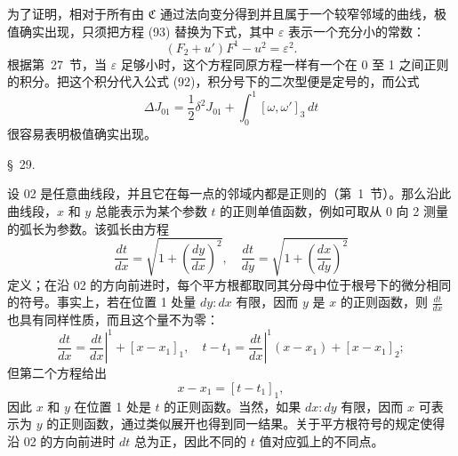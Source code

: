 \documentclass[11pt,a4paper,leqno]{article}
\begin{document}
为了证明，相对于所有由 $\mathfrak C$ 通过法向变分得到并且属于一个较窄邻域的曲线，极值确实出现，只须把方程 (93) 替换为下式，其中 $\varepsilon$ 表示一个充分小的常数：
\[
(F_2+u')F^1-u^2=\varepsilon^2.
\]
根据第~27~节，当 $\varepsilon$ 足够小时，这个方程同原方程一样有一个在 0 至 1 之间正则的积分。把这个积分代入公式 (92)，积分号下的二次型便是定号的，而公式
\[
\Delta J_{01}=\frac12\delta^2J_{01}+\int_0^1[\omega,\omega']_3\,dt
\]
很容易表明极值确实出现。

\begin{center}{\large \S~29.}\end{center}

设 02 是任意曲线段，并且它在每一点的邻域内都是正则的（第~1~节）。那么沿此曲线段，$x$ 和 $y$ 总能表示为某个参数 $t$ 的正则单值函数，例如可取从 0 向 2 测量的弧长为参数。该弧长由方程
\[
\frac{dt}{dx}=\sqrt{1+\left(\frac{dy}{dx}\right)^2},
\quad
\frac{dt}{dy}=\sqrt{1+\left(\frac{dx}{dy}\right)^2}
\]
定义；在沿 02 的方向前进时，每个平方根都取同其分母中位于根号下的微分相同的符号。事实上，若在位置 1 处量 $dy:dx$ 有限，因而 $y$ 是 $x$ 的正则函数，则 $\frac{dt}{dx}$ 也具有同样性质，而且这个量不为零：
\[
\frac{dt}{dx}=\left.\frac{dt}{dx}\right|^1+[x-x_1]_1,
\quad
t-t_1=\left.\frac{dt}{dx}\right|^1(x-x_1)+[x-x_1]_2;
\]
但第二个方程给出
\[
x-x_1=[t-t_1]_1,
\]
因此 $x$ 和 $y$ 在位置 1 处是 $t$ 的正则函数。当然，如果 $dx:dy$ 有限，因而 $x$ 可表示为 $y$ 的正则函数，通过类似展开也得到同一结果。关于平方根符号的规定使得沿 02 的方向前进时 $dt$ 总为正，因此不同的 $t$ 值对应弧上的不同点。
\end{document}
